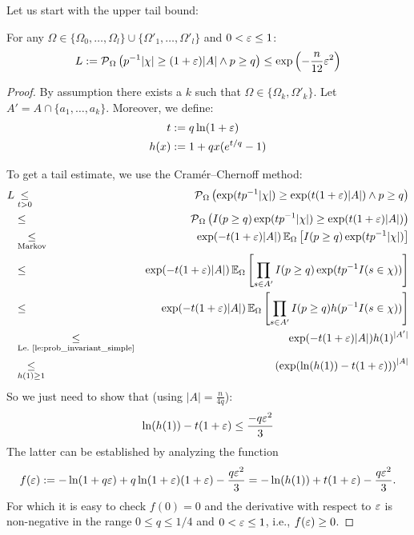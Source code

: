 Let us start with the upper tail bound:
\begin{lemma}
\label{le:upper_tail}
For any $\Omega \in \{\Omega_0,\ldots,\Omega_l\} \cup \{\Omega'_1,\ldots,\Omega'_l\}$ and
$0 < \varepsilon \leq 1$:
\[
L := \operatorname{\mathcal P}_{\Omega} \left( p^{-1} |\chi| \geq (1+\varepsilon) |A| \wedge p \geq q\right) \leq
  \exp\left(-\frac{n}{12} \varepsilon^2\right)
\]
\end{lemma}
\begin{proof}
By assumption there exists a $k$ such that $\Omega \in \{\Omega_k, \Omega'_k\}$.
Let $A' = A \cap \{a_1,\ldots,a_k\}$.
Moreover, we define:
\begin{align*}
  t & := q \ln( 1 + \varepsilon) \\
  h(x) & := 1+qx(e^{t/q}-1)
\end{align*}

To get a tail estimate, we use the Cram\'{e}r--Chernoff method:
{\allowdisplaybreaks
\begin{eqnarray*}
  L & \underset{t > 0}{\leq} & \operatorname{\mathcal P}_{\Omega} \left( \exp(t p^{-1} |\chi|) \geq
    \exp(t (1+\varepsilon) |A|) \wedge p \geq q \right) \\
  & \leq &
    \operatorname{\mathcal P}_{\Omega} \left( I(p \geq q) \exp(t p^{-1} |\chi|) \geq \exp(t (1+\varepsilon) |A|) \right) \\
  & \underset{\textrm{Markov}}{\leq} &
    \exp( -t (1+\varepsilon) |A| ) \operatorname{\mathbb E}_\Omega \left[ I(p \geq q) \exp ( t p^{-1} |\chi| ) \right] \\
 & \leq & \exp( -t (1+\varepsilon) |A| )
  \operatorname{\mathbb E}_\Omega \left[ \prod_{s \in A'} I(p \geq q) \exp ( t p^{-1} I(s \in \chi) ) \right] \\
 & \leq & \exp( -t (1+\varepsilon) |A| )
  \operatorname{\mathbb E}_\Omega \left[ \prod_{s \in A'} I(p \geq q) h( p^{-1} I(s \in \chi) ) \right] \\
 & \underset{\textrm{Le.~\ref{le:prob_invariant_simple}}}{\leq} & \exp( -t (1+\varepsilon) |A| ) h(1)^{|A'|} \\
 & \underset{h(1)\geq 1}{\leq} & \left(\exp( \ln(h(1)) -t (1+\varepsilon))\right) ^ {|A|}
\end{eqnarray*}}
So we just need to show that (using $|A|=\frac{n}{4q}$):
\[
  \ln(h(1))-t (1+\varepsilon) \leq \frac{-q \varepsilon^2}{3}
\]
The latter can be established by analyzing the function
\[
  f(\varepsilon) := -\ln(1+q \varepsilon) + q \ln(1+\varepsilon) (1+\varepsilon) - \frac{q \varepsilon^2}{3} =
    -\ln (h(1)) +t (1+\varepsilon) - \frac{q\varepsilon^2}{3} \textrm{.}
\]
For which it is easy to check $f(0) = 0$ and the derivative with respect to $\varepsilon$ is non-negative
in the range $0 \leq q \leq 1/4$ and $0 < \varepsilon \leq 1$, i.e., $f(\varepsilon) \geq 0$.
\end{proof}

